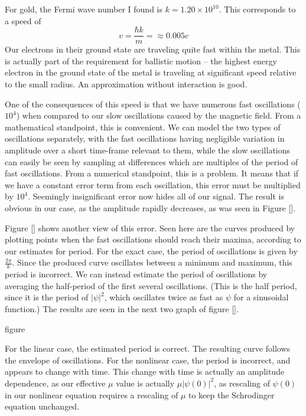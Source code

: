 \documentclass[A4,12pt,oneside]{article}
\renewcommand{\(}{\left(}
\renewcommand{\)}{\right)}
\begin{document}
For gold, the Fermi wave number I found is $k = 1.20 \times 10^{10}$. This corresponds to a speed of 
\begin{equation}
v = \frac{\hbar k}{m} = \approx 0.005 c
\end{equation}
Our electrons in their ground state are traveling quite fast within the metal. This is actually part of the requirement for ballistic motion -- the highest energy electron in the ground state of the metal is traveling at significant speed relative to the small radius. An approximation without interaction is good. 

One of the consequences of this speed is that we have numerous fast oscillations ($10^4$) when compared to our slow oscillations caused by the magnetic field. From a mathematical standpoint, this is convenient. We can model the two types of oscillations separately, with the fast oscillations having negligible variation in amplitude over a short time-frame relevant to them, while the slow oscillations can easily be seen by sampling at differences which are multiples of the period of fast oscillations. From a numerical standpoint, this is a problem. It means that if we have a constant error term from each oscillation, this error must be multiplied by $10^4$. Seemingly insignificant error now hides all of our signal. The result is obvious in our case, as the amplitude rapidly decreases, as was seen in Figure []. 
 
Figure [] shows another view of this error. Seen here are the curves produced by plotting points when the fast oscillations should reach their maxima, according to our estimates for period. For the exact case, the period of oscillations is given by $\frac{2 \pi}{k}$. Since the produced curve oscillates between a minimum and maximum, this period is incorrect. We can instead estimate the period of oscillations by averaging the half-period of the first several oscillations. (This is the half period, since it is the period of $\left|\psi\right|^2$, which oscillates twice as fast as $\psi$ for a sinusoidal function.) The results are seen in the next two graph of figure [].

figure

For the linear case, the estimated period is correct. The resulting curve follows the envelope of oscillations. For the nonlinear case, the period is incorrect, and appears to change with time. This change with time is actually an amplitude dependence, as our effective $\mu$ value is actually $\mu\left|\psi\left(0\right)\right|^2$, as rescaling of $\psi\left(0\right)$ in our nonlinear equation requires a rescaling of $\mu$ to keep the Schrodinger equation unchanged. 
\end{document}
